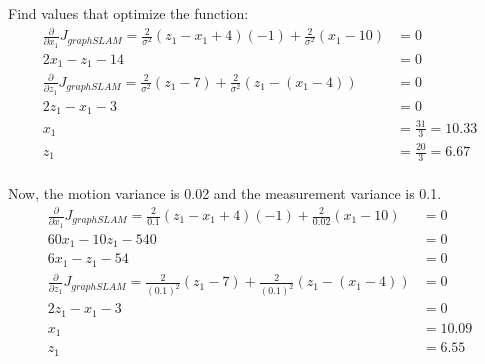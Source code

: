 \documentclass[10pt]{article}
\begin{document}
Find values that optimize the function:
\begin{align*}
\frac{\partial}{\partial x_1} J_{graphSLAM} = \frac{2}{\sigma^2} (z_1 - x_1 + 4)(-1) + \frac{2}{\sigma^2} (x_1 - 10) &= 0\\
2x_1 - z_1 - 14 &= 0\\
\frac{\partial}{\partial z_1} J_{graphSLAM} = \frac{2}{\sigma^2} (z_1 - 7) + \frac{2}{\sigma^2} (z_1 - (x_1 - 4)) &= 0\\
2z_1 - x_1 - 3 &= 0\\
x_1 &= \frac{31}{3} = 10.33\\
z_1 &= \frac{20}{3} = 6.67\\
\end{align*}

Now, the motion variance is 0.02 and the measurement variance is 0.1.
\begin{align*}
\frac{\partial}{\partial x_1} J_{graphSLAM} = \frac{2}{0.1} (z_1 - x_1 + 4)(-1) + \frac{2}{0.02} (x_1 - 10) &= 0\\
60x_1 - 10z_1 - 540 &= 0\\
6x_1 - z_1 - 54 &= 0\\
\frac{\partial}{\partial z_1} J_{graphSLAM} = \frac{2}{(0.1)^2} (z_1 - 7) + \frac{2}{(0.1)^2} (z_1 - (x_1 - 4)) &= 0\\
2z_1 - x_1 - 3 &= 0\\
x_1 &= 10.09\\
z_1 &= 6.55\\
\end{align*}
\end{document}

